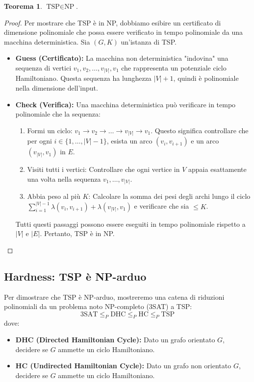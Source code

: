 \documentclass[a4paper]{article}
\theoremstyle{definition} %
\newtheorem{theorem}{Teorema}
\begin{document}
\begin{theorem}
$\text{TSP} \in \text{NP}$.
\end{theorem}
\begin{proof}
Per mostrare che TSP è in NP, dobbiamo esibire un certificato di dimensione polinomiale che possa essere verificato in tempo polinomiale da una macchina deterministica.
Sia $(G, K)$ un'istanza di TSP.
\begin{itemize}
    \item \textbf{Guess (Certificato):} La macchina non deterministica "indovina" una sequenza di vertici $v_1, v_2, \dots, v_{|V|}, v_1$ che rappresenta un potenziale ciclo Hamiltoniano. Questa sequenza ha lunghezza $|V|+1$, quindi è polinomiale nella dimensione dell'input.
    \item \textbf{Check (Verifica):} Una macchina deterministica può verificare in tempo polinomiale che la sequenza:
    \begin{enumerate}
        \item Formi un ciclo: $v_1 \to v_2 \to \dots \to v_{|V|} \to v_1$. Questo significa controllare che per ogni $i \in \{1, \dots, |V|-1\}$, esista un arco $(v_i, v_{i+1})$ e un arco $(v_{|V|}, v_1)$ in $E$.
        \item Visiti tutti i vertici: Controllare che ogni vertice in $V$ appaia esattamente una volta nella sequenza $v_1, \dots, v_{|V|}$.
        \item Abbia peso al più $K$: Calcolare la somma dei pesi degli archi lungo il ciclo $\sum_{i=1}^{|V|-1} \lambda(v_i, v_{i+1}) + \lambda(v_{|V|}, v_1)$ e verificare che sia $\le K$.
    \end{enumerate}
Tutti questi passaggi possono essere eseguiti in tempo polinomiale rispetto a $|V|$ e $|E|$.
Pertanto, TSP è in NP.
\end{itemize}
\end{proof}

\subsection{Hardness: TSP è NP-arduo}

Per dimostrare che TSP è NP-arduo, mostreremo una catena di riduzioni polinomiali da un problema noto $\text{NP}$-completo (3SAT) a TSP:
$$ \text{3SAT} \le_P \text{DHC} \le_P \text{HC} \le_P \text{TSP} $$
dove:
\begin{itemize}
    \item \textbf{DHC (Directed Hamiltonian Cycle):} Dato un grafo orientato $G$, decidere se $G$ ammette un ciclo Hamiltoniano.
    \item \textbf{HC (Undirected Hamiltonian Cycle):} Dato un grafo non orientato $G$, decidere se $G$ ammette un ciclo Hamiltoniano.
\end{itemize}
\end{document}
